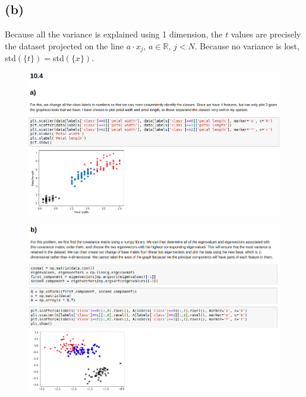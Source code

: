 \documentclass[11pt]{article}
\begin{document}
\subsection*{(b)}
Because all the variance is explained using 1 dimension, the $t$ values are precisely the dataset projected on the line $a\cdot x_j$, $a\in\mathbb{R}$, $j<N$. Because no variance is lost, std$(\{t\})=$std$(\{x\})$.
\clearpage
\begin{figure}[h!]
	\centering
	\includegraphics[width=200mm]{10_4a.png}
\end{figure}
\clearpage
\begin{figure}[h!]
	\centering
	\includegraphics[width=200mm]{10_4b.png}
\end{figure}
\clearpage
\end{document}
